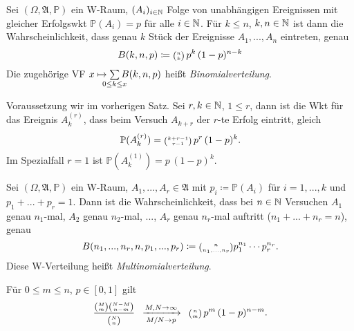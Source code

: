 \documentclass{cheat-sheet}
\newcommand{\Alg}{\mathfrak{A}} %
\renewcommand{\P}{\mathbb{P}}
\let\myBinom\binom
\renewcommand{\binom}[2]{\mathsmaller{\myBinom{#1}{#2}}}
\begin{document}




\begin{satz}
  Sei $(\Omega, \Alg, \P)$ ein W-Raum, $(A_i)_{i \in \mathbb{N}}$ Folge von unabhängigen Ereignissen mit gleicher Erfolgswkt $\P(A_i) = p$ für alle $i \in \mathbb{N}$. Für $k \leq n$, $k, n \in \mathbb{N}$ ist dann die Wahrscheinlichkeit, dass genau $k$ Stück der Ereignisse $A_1, ..., A_n$ eintreten, genau
  \[ B(k, n, p) \coloneqq \binom{n}{k} \, p^k \, (1-p)^{n-k} \]
  Die zugehörige VF $x \mapsto \sum_{\mathclap{0 \leq k \leq x}} B(k,n,p)$ heißt \emph{Binomialverteilung}.
\end{satz}


\begin{lem}
  Voraussetzung wir im vorherigen Satz. Sei $r, k \in \mathbb{N}$, $1 \leq r$, dann ist die Wkt für das Ereignis $A_k^{(r)}$, dass beim Versuch $A_{k+r}$ der $r$-te Erfolg eintritt, gleich
  \[ \P(A_k^{(r)}) = \binom{k+r-1}{r-1} \, p^r \, (1-p)^k. \]
  Im Spezialfall $r = 1$ ist $\P(A_k^{(1)}) = p \, (1-p)^k$.
\end{lem}

\begin{satz}
  Sei $(\Omega, \Alg, \P)$ ein W-Raum, $A_1, ..., A_r \in \Alg$ mit $p_i \coloneqq \P(A_i)$ für $i = 1, ..., k$ und $p_1 + ... + p_r = 1$. Dann ist die Wahrscheinlichkeit, dass bei $n \in \mathbb{N}$ Versuchen $A_1$ genau $n_1$-mal, $A_2$ genau $n_2$-mal, ..., $A_r$ genau $n_r$-mal auftritt ($n_1 + ... + n_r = n$), genau
  \[ B(n_1, ..., n_r, n, p_1, ..., p_r) \coloneqq \binom{n}{n_1, ..., n_r} p_1^{n_1} \cdots p_r^{n_r}. \]
  Diese W-Verteilung heißt \emph{Multinomialverteilung}.
\end{satz}


\begin{satz}
  Für $0 \leq m \leq n$, $p \in [0, 1]$ gilt
  \[ \frac{\binom{M}{m} \binom{N-M}{n-m}}{\binom{N}{n}} \enspace \xrightarrow[M/N \to p]{M, N \to \infty} \enspace \binom{n}{m} \, p^m \, (1-p)^{n-m}. \]
\end{satz}

\end{document}
